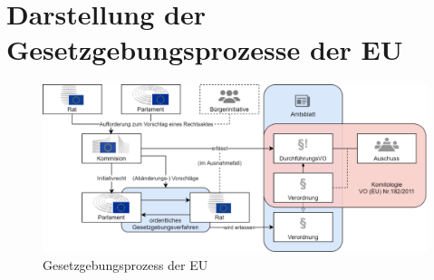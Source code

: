 
    \section{Darstellung der Gesetzgebungsprozesse der EU}

    
    \begin{figure}[H]
        \centering
        \includegraphics[width=\linewidth]{gfx/Gesegebungsprozess.png}
        \caption{Gesetzgebungsprozess der EU}
        \label{fig:europeg}
    \end{figure}
    